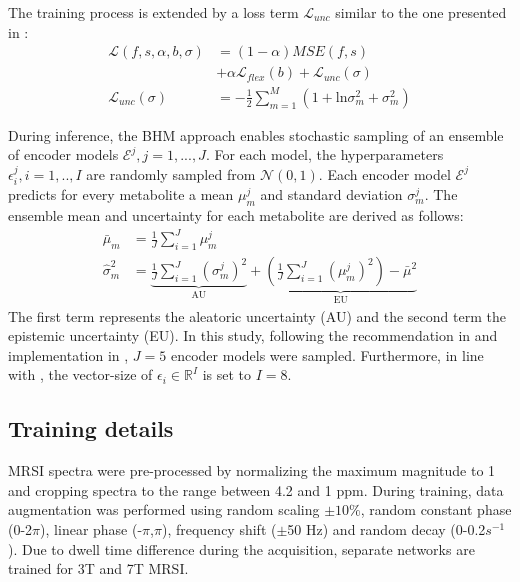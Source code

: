 \documentclass{article}
\begin{document}
        The training process is extended by a loss term $\mathcal{L}_{unc}$ similar to the one presented in \cite{shamaei2026phive}: 
        \begin{align}
            \mathcal{L}(f,s,\alpha,b,\sigma) &= (1-\alpha) MSE(f,s) \\
            &+ \alpha \mathcal{L}_{flex}(b) + \mathcal{L}_{unc}(\sigma) \\
            \mathcal{L}_{unc}(\sigma) &= -\frac{1}{2} \sum_{m=1}^M (1+\text{ln}\sigma_m^2+\sigma_m^2)
        \end{align}
        
        During inference, the BHM approach enables stochastic sampling of an ensemble of encoder models $\mathcal{E}^j, j=1,...,J$. For each model, the hyperparameters $\epsilon^j_i, i=1,..,I$ are randomly sampled from $\mathcal{N}(0,1)$. Each encoder model $\mathcal{E}^j$ predicts for every metabolite a mean $\mu^j_m$ and standard deviation $\sigma^j_m$. The ensemble mean and uncertainty for each metabolite are derived as follows:
        \begin{align}
            \bar{\mu}_m &= \frac{1}{J}\sum_{i=1}^J \mu^j_m \\
            \hat{\sigma}^2_m &= \underbrace{\frac{1}{J}\sum_{i=1}^J (\sigma^j_m)^2}_\text{AU} + 
            \underbrace{\left(\frac{1}{J}\sum_{i=1}^J (\mu^j_m)^2\right) -  \bar{\mu}^2}_\text{EU}
        \end{align}
        The first term represents the aleatoric uncertainty (AU) and the second term the epistemic uncertainty (EU). In this study, following the recommendation in \cite{lakshminarayanan2017simple} and implementation in \cite{shamaei2026phive}, $J=5$ encoder models were sampled. Furthermore, in line with \cite{chan2024estimating}, the vector-size of $\epsilon_i \in \mathbb{R}^I$ is set to $I=8$.
        
        
    \subsection{Training details}
        MRSI spectra were pre-processed by normalizing the maximum magnitude to 1 and cropping spectra to the range between 4.2 and 1 ppm. During training, data augmentation was performed using random scaling $\pm10\%$, random constant phase (0-2$\pi$), linear phase (-$\pi$,$\pi$), frequency shift ($\pm$50 Hz) and random decay (0-0.2$s^{-1}$). Due to dwell time difference during the acquisition, separate networks are trained for 3T and 7T MRSI.
        
\end{document}
